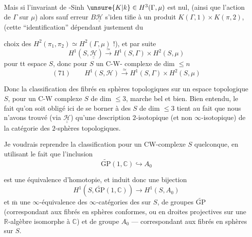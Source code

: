 Mais si l'invariant de -Sinh
$\unsure{K|k}\in H^3(\Gamma,\mu)$ est nul,
 (ainsi que l'action
de $\Gamma$ sur $\mu$) alors sauf erreur
$B\underline{\underline{\mathcal H}}$ s'iden%
tifie à un produit $K(\Gamma,1)\times K(\pi,2)$,
(cette ``identification'' dépendant justement du

choix des $H^2(\pi_1,\pi_2)\simeq H^2(\Gamma,\mu)$ !), et par
suite
\[
H^1(S,\underline{\underline{\mathcal H}})\xrightarrow{\simeq}
H^1(S,\Gamma)\times H^2(S,\mu)
\]
pour tt espace $S$, donc pour $S$ un C-W-%
complexe de dim $\leq n$
\[
(71)\qquad
H^1(S,\mathcal H)\xrightarrow{\simeq}H^1(S,\Gamma)\times H^2(S,\mu)
\]

Donc la classification des fibrés en sphères
topologiques sur un espace topologique $S$,
pour un C-W complexe $S$ de dim $\leq3$,
marche bel et bien. Bien entendu, le
fait qu'on soit obligé ici de se borner à
des  $S$ de dim $\leq3$ tient au fait
que nous n'avons trouvé 
(via $\underline{\underline{\mathcal H}}$)
qu'une description $2$-isotopique (et non
$\infty$-isotopique) de la catégorie des $2$-sphères
topologiques.

Je voudrais reprendre la classification
pour un CW-complexe $S$ quelconque, en
utilisant le fait que l'inclusion
\[
\widetilde{\mathrm{GP}}(1,\mathbb C)\hookrightarrow A_0
\]

est une équivalence d'homotopie, et induit
donc une bijection
\[
H^1(S,\widetilde{\mathrm{GP}}(1,\mathbb C))\longrightarrow H^1(S,A_0)
\]
et $\overline{\mathrm m}$ une $\infty$-équivalence des $\infty$-catégories des
  sur $S$, de  groupes
$\widetilde{\mathrm{GP}}$ (correspondant
aux fibrés en sphères conformes, ou en
droites projectives sur une  $\mathbb R$-algèbre
isomorphe à $\mathbb C$) et de groupe $A_0$ --- correspondant
aux fibrés en sphères sur $S$.

